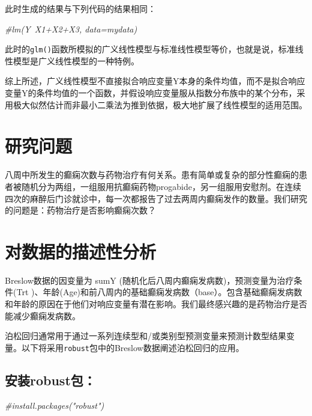 \documentclass[
]{article}
\newenvironment{Shaded}{\begin{snugshade}}{\end{snugshade}}
\newcommand{\CommentTok}[1]{\textcolor[rgb]{0.56,0.35,0.01}{\textit{#1}}}
\begin{document}
此时生成的结果与下列代码的结果相同：

\begin{Shaded}
\begin{Highlighting}[]
\CommentTok{#lm(Y~X1+X2+X3, data=mydata)}
\end{Highlighting}
\end{Shaded}

此时的\texttt{glm()}函数所模拟的广义线性模型与标准线性模型等价，也就是说，标准线性模型是广义线性模型的一种特例。

综上所述，广义线性模型不直接拟合响应变量Y本身的条件均值，而不是拟合响应变量Y的条件均值的一个函数，并假设响应变量服从指数分布族中的某个分布，采用极大似然估计而非最小二乘法为推到依据，极大地扩展了线性模型的适用范围。

\hypertarget{ux7814ux7a76ux95eeux9898}{%
\section{研究问题}\label{ux7814ux7a76ux95eeux9898}}

八周中所发生的癫痫次数与药物治疗有何关系。患有简单或复杂的部分性癫痫的患者被随机分为两组，一组服用抗癫痫药物progabide，另一组服用安慰剂。在连续四次的麻醉后门诊就诊中，每一次都报告了过去两周内癫痫发作的数量。我们研究的问题是：药物治疗是否影响癫痫次数？

\hypertarget{ux5bf9ux6570ux636eux7684ux63cfux8ff0ux6027ux5206ux6790}{%
\section{对数据的描述性分析}\label{ux5bf9ux6570ux636eux7684ux63cfux8ff0ux6027ux5206ux6790}}

Breslow数据的因变量为 sumY
(随机化后八周内癫痫发病数)，预测变量为治疗条件(Trt
)、年龄(Age)和前八周内的基础癫痫发病数（base）。包含基础癫痫发病数和年龄的原因在于他们对响应变量有潜在影响。我们最终感兴趣的是药物治疗是否能减少癫痫发病数。

泊松回归通常用于通过一系列连续型和/或类别型预测变量来预测计数型结果变量。以下将采用\texttt{robust}包中的Breslow数据阐述泊松回归的应用。

\hypertarget{ux5b89ux88c5robustux5305}{%
\subsection{安装robust包：}\label{ux5b89ux88c5robustux5305}}

\begin{Shaded}
\begin{Highlighting}[]
\CommentTok{#install.packages("robust")}
\end{Highlighting}
\end{Shaded}
\end{document}
